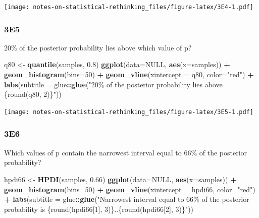 \documentclass[
]{book}
\newenvironment{Shaded}{\begin{snugshade}}{\end{snugshade}}
\newcommand{\DataTypeTok}[1]{\textcolor[rgb]{0.13,0.29,0.53}{#1}}
\newcommand{\DecValTok}[1]{\textcolor[rgb]{0.00,0.00,0.81}{#1}}
\newcommand{\FloatTok}[1]{\textcolor[rgb]{0.00,0.00,0.81}{#1}}
\newcommand{\KeywordTok}[1]{\textcolor[rgb]{0.13,0.29,0.53}{\textbf{#1}}}
\newcommand{\NormalTok}[1]{#1}
\newcommand{\OperatorTok}[1]{\textcolor[rgb]{0.81,0.36,0.00}{\textbf{#1}}}
\newcommand{\OtherTok}[1]{\textcolor[rgb]{0.56,0.35,0.01}{#1}}
\newcommand{\StringTok}[1]{\textcolor[rgb]{0.31,0.60,0.02}{#1}}
\begin{document}
\texttt{[image: notes-on-statistical-rethinking\_files/figure-latex/3E4-1.pdf]}

\hypertarget{e5}{%
\subsubsection*{3E5}\label{e5}}

20\% of the posterior probability lies above which value of p?

\begin{Shaded}
\begin{Highlighting}[]
\NormalTok{q80 \textless{}{-}}\StringTok{ }\KeywordTok{quantile}\NormalTok{(samples, }\FloatTok{0.8}\NormalTok{)}
\KeywordTok{ggplot}\NormalTok{(}\DataTypeTok{data=}\OtherTok{NULL}\NormalTok{, }\KeywordTok{aes}\NormalTok{(}\DataTypeTok{x=}\NormalTok{samples)) }\OperatorTok{+}\StringTok{ }
\StringTok{  }\KeywordTok{geom\_histogram}\NormalTok{(}\DataTypeTok{bins=}\DecValTok{50}\NormalTok{) }\OperatorTok{+}\StringTok{ }
\StringTok{  }\KeywordTok{geom\_vline}\NormalTok{(}\DataTypeTok{xintercept =}\NormalTok{ q80, }\DataTypeTok{color=}\StringTok{"red"}\NormalTok{) }\OperatorTok{+}\StringTok{ }
\StringTok{  }\KeywordTok{labs}\NormalTok{(}\DataTypeTok{subtitle =}\NormalTok{ glue}\OperatorTok{::}\KeywordTok{glue}\NormalTok{(}\StringTok{"20\% of the posterior probability lies above \{round(q80, 2)\}"}\NormalTok{))}
\end{Highlighting}
\end{Shaded}

\texttt{[image: notes-on-statistical-rethinking\_files/figure-latex/3E5-1.pdf]}

\hypertarget{e6}{%
\subsubsection*{3E6}\label{e6}}

Which values of p contain the narrowest interval equal to 66\% of the posterior probability?

\begin{Shaded}
\begin{Highlighting}[]
\NormalTok{hpdi66 \textless{}{-}}\StringTok{ }\KeywordTok{HPDI}\NormalTok{(samples, }\FloatTok{0.66}\NormalTok{)}
\KeywordTok{ggplot}\NormalTok{(}\DataTypeTok{data=}\OtherTok{NULL}\NormalTok{, }\KeywordTok{aes}\NormalTok{(}\DataTypeTok{x=}\NormalTok{samples)) }\OperatorTok{+}\StringTok{ }
\StringTok{  }\KeywordTok{geom\_histogram}\NormalTok{(}\DataTypeTok{bins=}\DecValTok{50}\NormalTok{) }\OperatorTok{+}\StringTok{ }
\StringTok{  }\KeywordTok{geom\_vline}\NormalTok{(}\DataTypeTok{xintercept =}\NormalTok{ hpdi66, }\DataTypeTok{color=}\StringTok{"red"}\NormalTok{) }\OperatorTok{+}\StringTok{ }
\StringTok{  }\KeywordTok{labs}\NormalTok{(}\DataTypeTok{subtitle =}\NormalTok{ glue}\OperatorTok{::}\KeywordTok{glue}\NormalTok{(}\StringTok{"Narrowest interval equal to 66\% of the posterior probability is \{round(hpdi66[1], 3)\}..\{round(hpdi66[2], 3)\}"}\NormalTok{))}
\end{Highlighting}
\end{Shaded}
\end{document}

